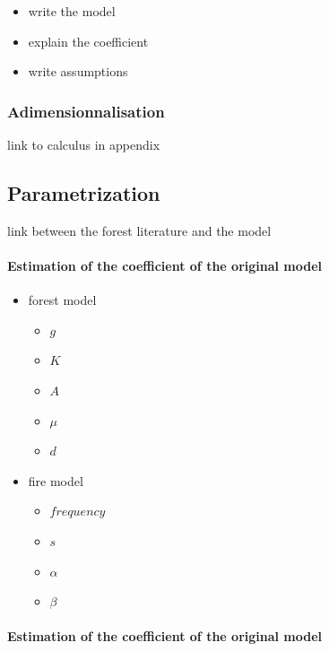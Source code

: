 \documentclass{article}
\begin{document}
\begin{itemize}
    \item write the model
    \item explain the coefficient
    \item write assumptions
\end{itemize}


\subsubsection{Adimensionnalisation}


link to calculus in appendix    





\subsection{Parametrization}

link between the forest literature and the model

\paragraph{Estimation of the coefficient of the original model}

\begin{itemize}
    \item forest model
    \begin{itemize}
        \item $g$
        \item $K$
        \item $A$
        \item $\mu$
        \item $d$
    \end{itemize}
    \item fire model
    \begin{itemize}
        \item $frequency$
        \item $s$
        \item $\alpha$
        \item $\beta$
    \end{itemize}
\end{itemize}



\paragraph{Estimation of the coefficient of the original model}
\end{document}
